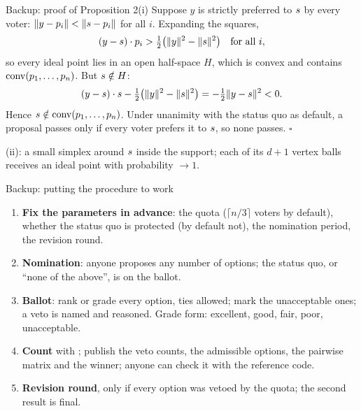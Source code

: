 \documentclass[10pt,aspectratio=169]{beamer}
\begin{document}
\begin{frame}{Backup: proof of Proposition 2(i)}
  Suppose $y$ is strictly preferred to $s$ by every voter: $\|y - p_i\| < \|s - p_i\|$ for all $i$.
  Expanding the squares,
  \[
    (y - s) \cdot p_i > \tfrac12\bigl(\|y\|^2 - \|s\|^2\bigr) \quad \text{for all } i,
  \]
  so every ideal point lies in an open half-space $H$, which is convex and contains
  $\operatorname{conv}(p_1, \dots, p_n)$. But $s \notin H$:
  \[
    (y - s) \cdot s - \tfrac12\bigl(\|y\|^2 - \|s\|^2\bigr) = -\tfrac12\|y - s\|^2 < 0.
  \]
  Hence $s \notin \operatorname{conv}(p_1, \dots, p_n)$. Under unanimity with the status quo as default, a proposal
  passes only if every voter prefers it to $s$, so none passes. \hfill$\square$
  \medskip

  (ii): a small simplex around $s$ inside the support; each of its $d+1$ vertex balls receives an ideal
  point with probability $\to 1$.
\end{frame}

\begin{frame}{Backup: putting the procedure to work}
  \begin{enumerate}
    \item \textbf{Fix the parameters in advance}: the quota ($\lceil n/3 \rceil$ voters by default), whether the
      status quo is protected (by default not), the nomination period, the revision round.
    \item \textbf{Nomination}: anyone proposes any number of options; the status quo, or ``none of the
      above'', is on the ballot.
    \item \textbf{Ballot}: rank or grade every option, ties allowed; mark the unacceptable ones; a veto is
      named and reasoned. Grade form: excellent, good, fair, poor, unacceptable.
    \item \textbf{Count} with \QVC; publish the veto counts, the admissible options, the pairwise matrix and
      the winner; anyone can check it with the reference code.
    \item \textbf{Revision round}, only if every option was vetoed by the quota; the second result is final.
  \end{enumerate}
  \medskip
\end{frame}
\end{document}
